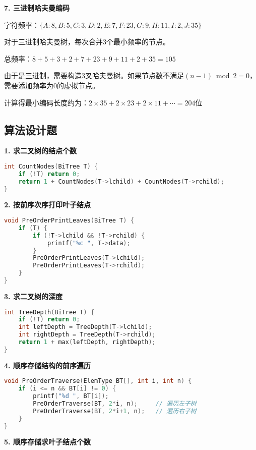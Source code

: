 \documentclass[12pt,a4paper]{amsart}
\begin{document}
\textbf{7. 三进制哈夫曼编码}

字符频率：$\{A:8, B:5, C:3, D:2, E:7, F:23, G:9, H:11, I:2, J:35\}$

对于三进制哈夫曼树，每次合并3个最小频率的节点。

总频率：$8+5+3+2+7+23+9+11+2+35=105$

由于是三进制，需要构造3叉哈夫曼树。如果节点数不满足$(n-1) \bmod 2 = 0$，需要添加频率为0的虚拟节点。

计算得最小编码长度约为：$2 \times 35 + 2 \times 23 + 2 \times 11 + \cdots = 204$位

\subsection{算法设计题}

\textbf{1. 求二叉树的结点个数}

\begin{lstlisting}[language=C++]
int CountNodes(BiTree T) {
    if (!T) return 0;
    return 1 + CountNodes(T->lchild) + CountNodes(T->rchild);
}
\end{lstlisting}

\textbf{2. 按前序次序打印叶子结点}

\begin{lstlisting}[language=C++]
void PreOrderPrintLeaves(BiTree T) {
    if (T) {
        if (!T->lchild && !T->rchild) {
            printf("%c ", T->data);
        }
        PreOrderPrintLeaves(T->lchild);
        PreOrderPrintLeaves(T->rchild);
    }
}
\end{lstlisting}

\textbf{3. 求二叉树的深度}

\begin{lstlisting}[language=C++]
int TreeDepth(BiTree T) {
    if (!T) return 0;
    int leftDepth = TreeDepth(T->lchild);
    int rightDepth = TreeDepth(T->rchild);
    return 1 + max(leftDepth, rightDepth);
}
\end{lstlisting}

\textbf{4. 顺序存储结构的前序遍历}

\begin{lstlisting}[language=C++]
void PreOrderTraverse(ElemType BT[], int i, int n) {
    if (i <= n && BT[i] != 0) {
        printf("%d ", BT[i]);
        PreOrderTraverse(BT, 2*i, n);     // 遍历左子树
        PreOrderTraverse(BT, 2*i+1, n);   // 遍历右子树
    }
}
\end{lstlisting}

\textbf{5. 顺序存储求叶子结点个数}
\end{document}
